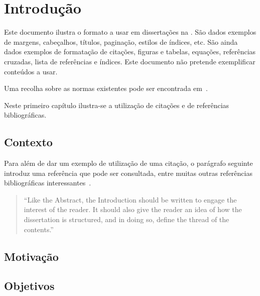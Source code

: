 \chapter{Introdução} \label{chap:intro}

Este documento ilustra o formato a usar em dissertações na \Feup.
São dados exemplos de margens, cabeçalhos, títulos, paginação, estilos
de índices, etc. 
São ainda dados exemplos de formatação de citações, figuras e tabelas,
equações, referências cruzadas, lista de referências e índices.
Este documento não pretende exemplificar conteúdos a usar.

Uma recolha sobre as normas existentes pode ser encontrada em~\citet{kn:Mat93}.

Neste primeiro capítulo ilustra-se a utilização de citações e de
referências bibliográficas.

\section{Contexto} \label{sec:context}

Para além de dar um exemplo de utilização de uma citação, o parágrafo
seguinte introduz uma referência que pode ser consultada, entre muitas
outras referências bibliográficas interessantes~\citep{kn:Tha01,kn:PP05}.

\begin{quote}
  ``Like the Abstract, the Introduction should be written to engage the
  interest of the reader. It should also give the reader an idea of
  how the dissertation is structured, and in doing so, define the
  thread of the contents.''~\citep[chap.\ Introduction]{kn:Tha01} 
\end{quote}


\section{Motivação} \label{sec:motivation}

\blindtext


\section{Objetivos} \label{sec:goals}

\Blindtext




